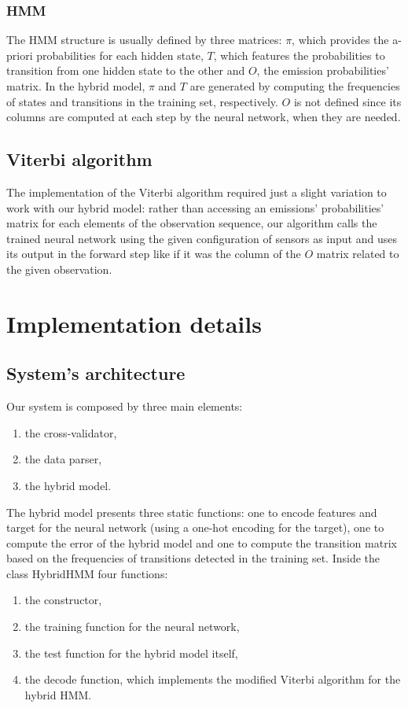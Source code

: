\documentclass[10pt,a4paper]{article}
\begin{document}
	\subsubsection{HMM}
	The HMM structure is usually defined by three matrices: $\pi$, which provides the a-priori probabilities for each hidden state, $T$, which features the probabilities to transition from one hidden state to the other and  $O$, the emission probabilities' matrix. In the hybrid model, $\pi$ and $T$ are generated by computing the frequencies of states and transitions in the training set, respectively. $O$ is not defined since its columns are computed at each step by the neural network, when they are needed. 
	\subsection{Viterbi algorithm}
	The implementation of the Viterbi algorithm required just a slight variation to work with our hybrid model: rather than accessing an emissions' probabilities' matrix for each elements of the observation sequence, our algorithm calls the trained neural network using the given configuration of sensors as input and uses its output in the forward step like if it was the column of the $O$ matrix related to the given observation.
	
	\section{Implementation details}
	\subsection{System's architecture}
	Our system is composed by three main elements:
	\begin{enumerate}
		\item the cross-validator,
		\item the data parser,
		\item the hybrid model.
	\end{enumerate}
The hybrid model presents three static functions: one to encode features and target for the neural network (using a one-hot encoding for the target), one to compute the error of the hybrid model and one to compute the transition matrix based on the frequencies of transitions detected in the training set. Inside the class HybridHMM four functions:
\begin{enumerate}
	\item the constructor,
	\item the training function for the neural network,
	\item the test function for the hybrid model itself,
	\item the decode function, which implements the modified Viterbi algorithm for the hybrid HMM.
\end{enumerate}
\end{document}
